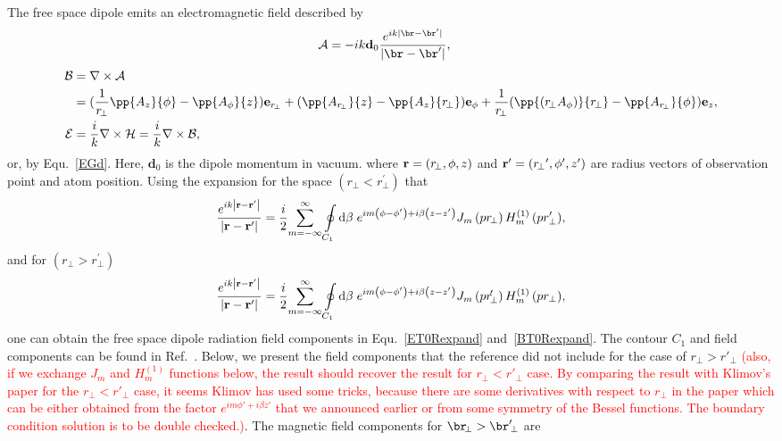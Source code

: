 \documentclass[]{report}
\begin{document}
The free space dipole emits an electromagnetic field described by
\begin{align}
\mathcal{A} &= -ik \mathbf{d}_0 \frac{e^{ik|\br-\br'|}}{|\br-\br'|},
\end{align}
\begin{align}
\mathcal{B} &= \nabla\times \mathcal{A}\nonumber \\
&=(\frac{1}{r\!_\perp}\pp{A_z}{\phi}-\pp{A_\phi}{z})\mathbf{e}_{r\!_{\perp}}+(\pp{A_{r\!_\perp}}{z}-\pp{A_z}{r\!_\perp})\mathbf{e}_\phi + \frac{1}{r\!_\perp}(\pp{(r\!_\perp A_\phi)}{r\!_\perp}-\pp{A_{r\!_\perp}}{\phi})\mathbf{e}_z,\\
\mathcal{E} &= \frac{i}{k} \nabla\times \mathcal{H}=\frac{i}{k}\nabla\times \mathcal{B},
\end{align}
or, by Equ.~\ref{EGd}. Here, $ \mathbf{d}_0 $ is the dipole momentum in vacuum. where ${\rm {\bf r}}=\left( {r\!_\perp ,\phi ,z}\right) $ and ${\rm 
{\bf {r}^{\prime }}}=\left( {{r\!_\perp }^{\prime },{\phi }^{\prime },{z}%
^{\prime }}\right) $ are radius vectors of observation point and atom
position. Using the expansion for the space $ \left(r\!_\perp <r_\perp ^{\prime}\right) $ that 
\begin{align}
{\frac{{e^{ik{\left| {{\rm {\bf r}}-{\rm {\bf {r}^{\prime }}}}\right| }}}}{{{%
\left| {{\rm {\bf r}}-{\rm {\bf {r}^{\prime }}}}\right| }}}}
={\frac{{i}}{{2}}%
}{\sum\limits_{m=-\infty }^{\infty } {{\oint\limits_{C_{1}}{\mathrm{d}\beta \;e^{im\left( {\phi -{\phi }%
^{\prime }}\right) +i\beta \left( {z-{z}^{\prime }}\right) }J_{m}\left( {pr\!_\perp
}\right) H_{m}^{\left( {1}\right) }\left( pr_\perp ^{\prime
}\right) }}}},
\end{align}
and for $ \left(r\!_\perp >r_\perp ^{\prime}\right) $
\begin{align}
{\frac{{e^{ik{\left| {{\rm {\bf r}}-{\rm {\bf {r}^{\prime }}}}\right| }}}}{{{%
\left| {{\rm {\bf r}}-{\rm {\bf {r}^{\prime }}}}\right| }}}}
={\frac{{i}}{{2}}%
}{\sum\limits_{m=-\infty }^{\infty } {{\oint\limits_{C_{1}}{\mathrm{d}\beta \;e^{im\left( {\phi -{\phi }%
^{\prime }}\right) +i\beta \left( {z-{z}^{\prime }}\right) }J_{m}\left( {pr\!_\perp^{\prime} }\right) H_{m}^{\left( {1}\right) }\left( pr_\perp \right) }}}},
\end{align}
one can obtain the free space dipole radiation field components in Equ.~\ref{ET0Rexpand} and~\ref{BT0Rexpand}. The contour $ C_1 $ and field components can be found in Ref.~\cite{Klimov2004}. Below, we present the field components that the reference did not include for the case of $ r\!_\perp>r'\!_\perp $ \textcolor{red}{(also, if we exchange $ J_m $ and $ H^{(1)}_m $ functions below, the result should recover the result for $ r\!_\perp<r'\!_\perp $ case. By comparing the result with Klimov's paper for the $ r\!_\perp<r'\!_\perp $ case, it seems Klimov has used some tricks, because there are some derivatives with respect to $r\!_\perp$ in the paper which can be either obtained from the factor $  e^{im\phi' + i\beta z'}  $ that we announced earlier or from some symmetry of the Bessel functions. The boundary condition solution is to be double checked.)}. The magnetic field components for $ \br\!_\perp>\br'\!_\perp $ are 
\end{document}
